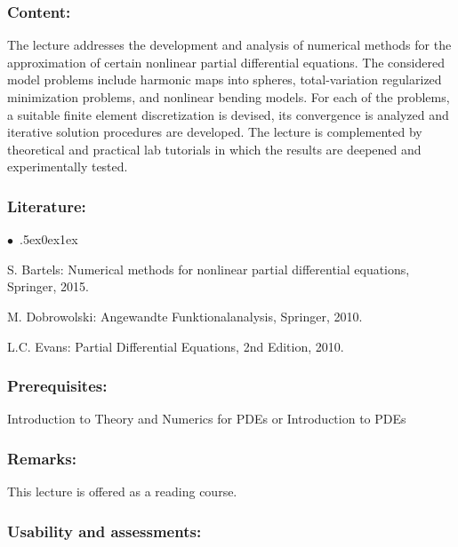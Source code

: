 \documentclass[a4paper,10pt]{article}
\renewenvironment{itemize}{\begin{list}{$\bullet$\ }{\itemsep.5ex\setlength{\topsep}{0.5\itemsep}\parsep0ex\labelsep1ex\settowidth{\labelwidth}{$\bullet$\ }\setlength{\leftmargin}{\labelwidth}\addtolength{\leftmargin}{3ex}\addtolength{\leftmargin}{\labelsep}}}{\end{list}}
\begin{document}
\subsubsection*{\large
    Content:
}
The lecture addresses the development and analysis of numerical methods for the approximation of certain nonlinear partial differential equations. The considered model problems include harmonic maps into spheres, total-variation regularized minimization problems, and nonlinear bending models. For each of the problems, a suitable finite element discretization is devised, its convergence is analyzed and iterative solution procedures are developed. The lecture is complemented by theoretical and practical lab tutorials in which the results are deepened and experimentally tested. 
\subsubsection*{\large
    Literature:
}
\begin{itemize}
\item
S. Bartels: Numerical methods for nonlinear partial differential equations, Springer, 2015.
\item
M. Dobrowolski: Angewandte Funktionalanalysis, Springer, 2010.
\item
L.C. Evans: Partial Differential Equations, 2nd Edition, 2010. 
\end{itemize}
\subsubsection*{\large
    Prerequisites:
}
Introduction to Theory and Numerics for PDEs or Introduction to PDEs
\subsubsection*{\large
    Remarks:
}
This lecture is offered as a reading course.
\cleardoublepage
\subsubsection*{\large
    Usability and assessments:
}
\end{document}
